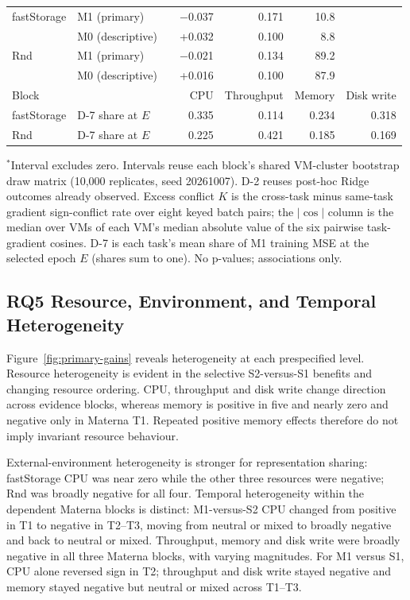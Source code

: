 \documentclass[5p,twocolumn]{elsarticle}
\begin{document}
\begin{table}[t]
\begin{tabular*}{\textwidth}{@{\extracolsep{\fill}}lllrrrr@{}}
    \midrule
    fastStorage & M1 (primary) & & $-$0.037 & 0.171 & 10.8 & \\
     & M0 (descriptive) & & +0.032 & 0.100 & 8.8 & \\
    Rnd & M1 (primary) & & $-$0.021 & 0.134 & 89.2 & \\
     & M0 (descriptive) & & +0.016 & 0.100 & 87.9 & \\
    \midrule
    Block & & & CPU & Throughput & Memory & Disk write \\
    \midrule
    fastStorage & D-7 share at $E$ & & 0.335 & 0.114 & 0.234 & 0.318 \\
    Rnd & D-7 share at $E$ & & 0.225 & 0.421 & 0.185 & 0.169 \\
    \bottomrule
  \end{tabular*}

  \vspace{2pt}
  \parbox{\textwidth}{\footnotesize $^{*}$Interval excludes zero. Intervals reuse each block's shared VM-cluster bootstrap draw matrix (10{,}000 replicates, seed 20261007). D-2 reuses post-hoc Ridge outcomes already observed. Excess conflict $K$ is the cross-task minus same-task gradient sign-conflict rate over eight keyed batch pairs; the $|\cos|$ column is the median over VMs of each VM's median absolute value of the six pairwise task-gradient cosines. D-7 is each task's mean share of M1 training MSE at the selected epoch $E$ (shares sum to one). No p-values; associations only.}
\end{table}


\subsection{RQ5 Resource, Environment, and Temporal Heterogeneity}
\label{sec:results-rq4}

Figure~\ref{fig:primary-gains} reveals heterogeneity at each prespecified
level. Resource heterogeneity is evident in the selective S2-versus-S1
benefits and changing resource ordering. CPU, throughput and disk write change
direction across evidence blocks, whereas memory is positive in five and
nearly zero and negative only in Materna T1. Repeated positive memory effects
therefore do not imply invariant resource behaviour.

External-environment heterogeneity is stronger for representation sharing: fastStorage
CPU was near zero while the other three resources were negative; Rnd was
broadly negative for all four. Temporal heterogeneity within the dependent
Materna blocks is distinct: M1-versus-S2 CPU changed from positive in T1 to
negative in T2--T3, moving from neutral or mixed to broadly negative and back
to neutral or mixed. Throughput, memory and disk write were broadly negative
in all three Materna blocks, with varying magnitudes. For M1 versus S1, CPU
alone reversed sign in T2; throughput and disk write stayed negative and
memory stayed negative but neutral or mixed across T1--T3.
\end{document}
